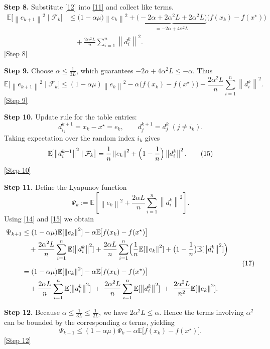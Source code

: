 \documentclass[12pt]{article}
\newcommand{\E}{\mathbb{E}}
\newcommand{\norm}[1]{\left\| #1\right\|}
\begin{document}
\noindent\textbf{Step 8.} Substitute \eqref{12} into \eqref{11} and collect like terms.
\[
\begin{aligned}
\E\!\bigl[\norm{e_{k+1}}^{2}\mid\mathcal{F}_k\bigr]
&\le \bigl(1-\alpha\mu\bigr)\norm{e_k}^{2}
+\underbrace{\bigl(-2\alpha+2\alpha^{2}L+2\alpha^{2}L\bigr)}_{\displaystyle =-2\alpha+4\alpha^{2}L}
\bigl(f(x_k)-f(x^{\star})\bigr)\\
&\quad+\frac{2\alpha^{2}L}{n}\sum_{i=1}^{n}\norm{d_i^{k}}^{2}.
\end{aligned}
\tag{13}
\]
\underline{[Step 8]}

\noindent\textbf{Step 9.} Choose $\alpha\le\frac{1}{3L}$, which guarantees $-2\alpha+4\alpha^{2}L\le -\alpha$.
Thus
\[
\E\!\bigl[\norm{e_{k+1}}^{2}\mid\mathcal{F}_k\bigr]
\le (1-\alpha\mu)\norm{e_k}^{2}
-\alpha\bigl(f(x_k)-f(x^{\star})\bigr)
+\frac{2\alpha^{2}L}{n}\sum_{i=1}^{n}\norm{d_i^{k}}^{2}.
\tag{14}
\]
\underline{[Step 9]}

\noindent\textbf{Step 10.} Update rule for the table entries:
\[
d_{i_k}^{k+1}=x_k-x^{\star}=e_k,\qquad
d_{j}^{k+1}=d_{j}^{k}\;(j\neq i_k).
\]
Taking expectation over the random index $i_k$ gives
\[
\E\!\bigl[\norm{d_{i}^{k+1}}^{2}\mid\mathcal{F}_k\bigr]
= \frac1n\norm{e_k}^{2}+\Bigl(1-\frac1n\Bigr)\norm{d_i^{k}}^{2}.
\tag{15}
\]
\underline{[Step 10]}

\noindent\textbf{Step 11.} Define the Lyapunov function
\[
\Psi_k:=\E\!\left[\norm{e_k}^{2}
+\frac{2\alpha L}{n}\sum_{i=1}^{n}\norm{d_i^{k}}^{2}\right].
\tag{16}
\]
Using \eqref{14} and \eqref{15} we obtain
\[
\begin{aligned}
\Psi_{k+1}
&\le (1-\alpha\mu)\E[\norm{e_k}^{2}]
-\alpha\E\!\bigl[f(x_k)-f(x^{\star})\bigr]\\
&\quad+\frac{2\alpha^{2}L}{n}\sum_{i=1}^{n}\E[\norm{d_i^{k}}^{2}]
+\frac{2\alpha L}{n}\sum_{i=1}^{n}\Bigl(\frac1n\E[\norm{e_k}^{2}]
+\bigl(1-\frac1n\bigr)\E[\norm{d_i^{k}}^{2}]\Bigr)\\[2mm]
&= (1-\alpha\mu)\E[\norm{e_k}^{2}]
-\alpha\E\!\bigl[f(x_k)-f(x^{\star})\bigr]\\
&\quad+\frac{2\alpha L}{n}\sum_{i=1}^{n}\E[\norm{d_i^{k}}^{2}]
\;+\;\frac{2\alpha^{2}L}{n}\sum_{i=1}^{n}\E[\norm{d_i^{k}}^{2}]
\;+\;\frac{2\alpha^{2}L}{n^{2}}\E[\norm{e_k}^{2}].
\end{aligned}
\tag{17}
\]

\noindent\textbf{Step 12.} Because $\alpha\le\frac{1}{3L}\le\frac{1}{2L}$, we have $2\alpha^{2}L\le\alpha$. Hence the terms involving $\alpha^{2}$ can be bounded by the corresponding $\alpha$ terms, yielding
\[
\Psi_{k+1}\le (1-\alpha\mu)\Psi_{k}
-\alpha\E\!\bigl[f(x_k)-f(x^{\star})\bigr]. \tag{18}
\]
\underline{[Step 12]}
\end{document}
